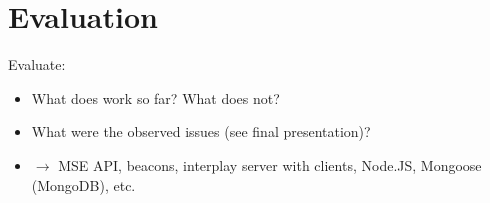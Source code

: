 \chapter{Evaluation}
\label{cha:evaluation}

Evaluate:
\begin{itemize}
    \item What does work so far? What does not?
    \item What were the observed issues (see final presentation)?
    \item $\rightarrow$ MSE API, beacons, interplay server with clients, Node.JS, Mongoose (MongoDB), etc.
\end{itemize}

\hline